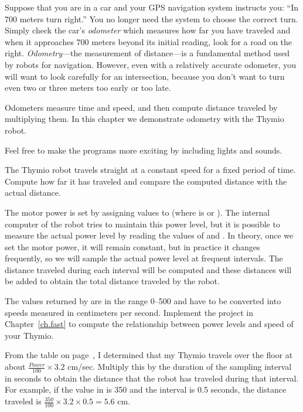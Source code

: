 \label{ch.odo}

Suppose that you are in a car and your GPS navigation system
instructs you: ``In 700 meters turn right.'' You no longer need the
system to choose the correct turn. Simply check the car's
\emph{odometer} which measures how far you have traveled and when it
approaches 700 meters beyond its initial reading, look for a road
on the right. \emph{Odometry}---the measurement of distance---is a
fundamental method used by robots for navigation.
However, even with a relatively accurate odometer, you will
want to look carefully for an intersection, because you don't want to
turn even two or three meters too early or too late.

Odometers measure time and speed,
and then compute distance traveled by multiplying them. In
this chapter we demonstrate odometry with the Thymio robot.

Feel free to make the programs more exciting by including lights
and sounds.


The Thymio robot travels straight at a constant speed for a fixed
period of time. Compute how far it has traveled and compare the
computed distance with the actual distance.


The motor power is set by assigning values to
 (where  is  or ). The internal
computer of the robot tries to maintain this power level, but it is
possible to measure the actual power level by reading the values of
 and . In theory, once we set
the motor power, it will remain constant, but in practice it changes
frequently, so we will sample the actual power level at frequent
intervals. The distance traveled during each interval will be computed
and these distances will be added to obtain the total distance
traveled by the robot.

The values returned by  are in the range 0--500 and
have to be converted into speeds measured in centimeters per second.
Implement the project in Chapter~\ref{ch.fast}
to compute the relationship between
power levels and speed of your Thymio.

From the table on page~\pageref{tab.speed},
I determined that my Thymio travels over the floor
at about $\frac{\mathit{Power}}{100}\times 3.2$ cm/sec. Multiply this by
the duration of the sampling interval in seconds to obtain the distance
that the robot has traveled during that interval. For example, if the
value in  is 350 and the interval is 0.5 seconds,
the distance traveled is $\frac{350}{100}\times 3.2 \times 0.5 = 5.6$ cm.

